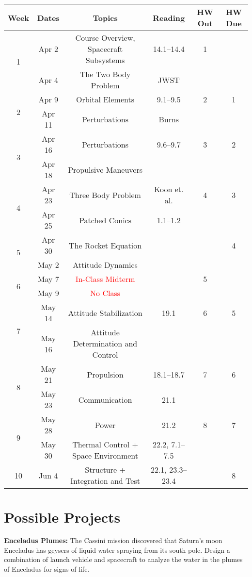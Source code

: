 \documentclass[11pt,letterpaper]{article}
\begin{document}
\begin{tabular}{c|c|c|c|c|c}
	Week & Dates & Topics & Reading & HW Out & HW Due \\
	\hline
	\multirow{2}{*}{1} & Apr 2 & Course Overview, Spacecraft Subsystems & 14.1--14.4 & 1 & \\
	 & Apr 4 & The Two Body Problem & JWST & & \\
	\hline
	\multirow{2}{*}{2} & Apr 9 & Orbital Elements & 9.1--9.5 & 2 & 1 \\
	 & Apr 11 & Perturbations & Burns & & \\
	\hline
	\multirow{2}{*}{3}  & Apr 16 & Perturbations & 9.6--9.7 & 3 & 2\\
	 & Apr 18 & Propulsive Maneuvers & & & \\
	\hline
	\multirow{2}{*}{4}  & Apr 23 & Three Body Problem & Koon et. al. & 4 & 3\\
	 & Apr 25 & Patched Conics & 1.1--1.2& & \\
	\hline
	\multirow{2}{*}{5}  & Apr 30 & The Rocket Equation & & & 4\\
	 & May 2 & Attitude Dynamics & & & \\
	\hline
	\multirow{2}{*}{6}  & May 7 & \textcolor{red}{In-Class Midterm} &  & 5 & \\
	 & May 9 & \textcolor{red}{No Class} & & & \\
	\hline
	\multirow{2}{*}{7}  & May 14 & Attitude Stabilization & 19.1 & 6 & 5\\
	 & May 16 & Attitude Determination and Control & & & \\
	\hline
	\multirow{2}{*}{8}  & May 21 & Propulsion & 18.1--18.7 & 7 & 6\\
	 & May 23 & Communication & 21.1 & & \\
	\hline
	\multirow{2}{*}{9}  & May 28 & Power & 21.2 & 8 & 7\\
	 & May 30 & Thermal Control + Space Environment & 22.2, 7.1--7.5 & & \\
	\hline
	10 & Jun 4 & Structure + Integration and Test & 22.1, 23.3--23.4 & & 8\\
\end{tabular}

\section*{Possible Projects}

\textbf{Enceladus Plumes:} The Cassini mission discovered that Saturn's moon Enceladus has geysers of liquid water spraying from its south pole. Design a combination of launch vehicle and spacecraft to analyze the water in the plumes of Enceladus for signs of life.
\end{document}
